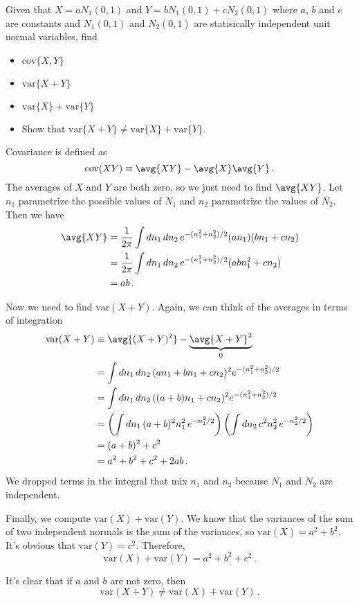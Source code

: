 

Given that $X = a N_1(0, 1)$ and $Y = b N_1(0, 1) + c N_2(0, 1)$ where $a$, $b$ and $c$ are constants and $N_1(0,1)$ and $N_2(0,1)$ are statisically independent unit normal variables, find
\begin{itemize}
  \item $\text{cov}\{ X, Y \}$
  \item $\text{var} \{ X + Y \}$
  \item $\text{var}\{ X \} + \text{var}\{ Y \}$
  \item Show that $\text{var} \{ X + Y \} \neq \text{var} \{ X \} + \text{var} \{ Y \}$.
\end{itemize}


Covariance is defined as
\begin{equation*}
  \text{cov}(XY) \equiv \avg{XY} - \avg{X}\avg{Y} \, .
\end{equation*}
The averages of $X$ and $Y$ are both zero, so we just need to find $\avg{XY}$.
Let $n_1$ parametrize the possible values of $N_1$ and $n_2$ parametrize the values of $N_2$.
Then we have
\begin{align*}
  \avg{XY}
  &= \frac{1}{2\pi} \int d n_1 \, d n_2 \, e^{-(n_1^2 + n_2^2) / 2} (a n_1) (b n_1 + c n_2) \\
  &= \frac{1}{2\pi} \int d n_1 \, d n_2 \, e^{-(n_1^2 + n_2^2) / 2} (ab n_1^2 + c n_2) \\
  &= ab \, .
\end{align*}

Now we need to find $\text{var}(X + Y)$.
Again, we can think of the averages in terms of integration
\begin{align*}
  \text{var}(X + Y)
  &\equiv \avg{(X + Y)^2} - \underbrace{\avg{X + Y}^2}_0 \\
  &= \int dn_1 \, dn_2 \, ( a n_1 + b n_1 + c n_2)^2 e^{-(n_1^2 + n_2^2) / 2} \\
  &= \int dn_1 \, dn_2 \, ( (a + b) n_1 + c n_2)^2 e^{-(n_1^2 + n_2^2) / 2} \\
  &= \left( \int dn_1 \, (a + b)^2 n_1^2 \, e^{-n_1^2 / 2} \right)
     \left( \int dn_2 \, c^2 n_2^2 \, e^{-n_2^2 / 2} \right) \\
  &= (a + b)^2 + c^2 \\
  &= a^2 + b^2 + c^2 + 2ab \, .
\end{align*}
We dropped terms in the integral that mix $n_1$ and $n_2$ because $N_1$ and $N_2$ are independent.

Finally, we compute $\text{var}(X) + \text{var}(Y)$.
We know that the variances of the sum of two independent normals is the sum of the variances, so $\text{var}(X) = a^2 + b^2$.
It's obvious that $\text{var}(Y) = c^2$.
Therefore,
\begin{equation*}
  \text{var}(X) + \text{var}(Y) = a^2 + b^2 + c^2 \, .
\end{equation*}

It's clear that if $a$ and $b$ are not zero, then
\begin{equation*}
  \text{var}(X + Y) \neq \text{var}(X) + \text{var}(Y) \, .
\end{equation*}
